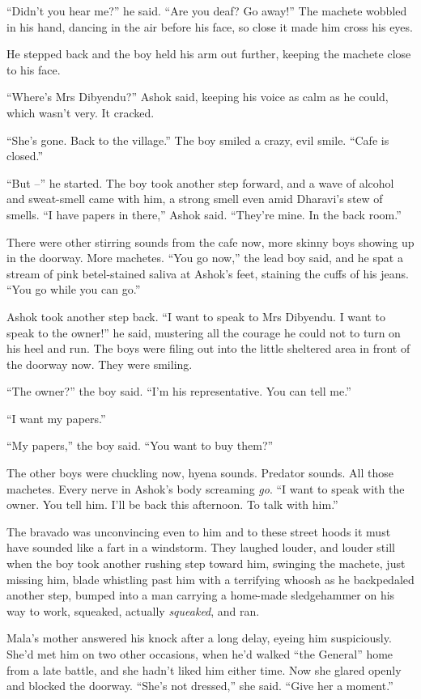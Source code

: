 ``Didn't you hear me?'' he said. ``Are you deaf? Go away!'' The machete
wobbled in his hand, dancing in the air before his face, so close
it made him cross his eyes.

He stepped back and the boy held his arm out further, keeping the
machete close to his face.

``Where's Mrs Dibyendu?'' Ashok said, keeping his voice as calm as he
could, which wasn't very. It cracked.

``She's gone. Back to the village.'' The boy smiled a crazy, evil
smile. ``Cafe is closed.''

``But --'' he started. The boy took another step forward, and a wave
of alcohol and sweat-smell came with him, a strong smell even amid
Dharavi's stew of smells. ``I have papers in there,'' Ashok said.
``They're mine. In the back room.''

There were other stirring sounds from the cafe now, more skinny
boys showing up in the doorway. More machetes. ``You go now,'' the
lead boy said, and he spat a stream of pink betel-stained saliva at
Ashok's feet, staining the cuffs of his jeans. ``You go while you
can go.''

Ashok took another step back. ``I want to speak to Mrs Dibyendu. I
want to speak to the owner!'' he said, mustering all the courage he
could not to turn on his heel and run. The boys were filing out
into the little sheltered area in front of the doorway now. They
were smiling.

``The owner?'' the boy said. ``I'm his representative. You can tell
me.''

``I want my papers.''

``My papers,'' the boy said. ``You want to buy them?''

The other boys were chuckling now, hyena sounds. Predator sounds.
All those machetes. Every nerve in Ashok's body screaming
\emph{go}. ``I want to speak with the owner. You tell him. I'll be
back this afternoon. To talk with him.''

The bravado was unconvincing even to him and to these street hoods
it must have sounded like a fart in a windstorm. They laughed
louder, and louder still when the boy took another rushing step
toward him, swinging the machete, just missing him, blade whistling
past him with a terrifying whoosh as he backpedaled another step,
bumped into a man carrying a home-made sledgehammer on his way to
work, squeaked, actually \emph{squeaked}, and ran.

Mala's mother answered his knock after a long delay, eyeing him
suspiciously. She'd met him on two other occasions, when he'd
walked ``the General'' home from a late battle, and she hadn't liked
him either time. Now she glared openly and blocked the doorway.
``She's not dressed,'' she said. ``Give her a moment.''

